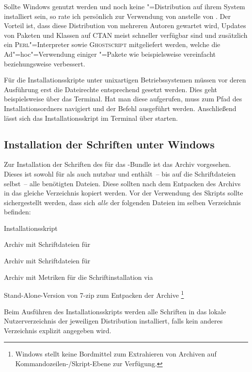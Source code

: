 Sollte Windows genutzt werden und noch keine "=Distribution auf 
ihrem System installiert sein, so rate ich persönlich zur Verwendung von 
 anstelle von . 
Der Vorteil ist, dass diese Distribution von mehreren Autoren gewartet wird, 
Updates von Paketen und Klassen auf CTAN meist schneller verfügbar sind und 
zusätzlich ein \textsc{Perl}"=Interpreter sowie \textsc{Ghostscript} 
mitgeliefert werden, welche die Ad"=hoc"=Verwendung einiger 
"=Pakete wie beispielsweise  vereinfacht 
beziehungsweise verbessert.

Für die Installationsskripte unter unixartigen Betriebssystemen müssen vor 
deren Ausführung erst die Dateirechte entsprechend gesetzt werden. Dies geht 
beispielsweise über das Terminal. Hat man diese aufgerufen, muss zum Pfad des 
Installationsordners navigiert und der Befehl 
ausgeführt werden. Anschließend lässt sich das Installationsskript im Terminal
über  starten.


\subsection{Installation der Schriften unter Windows}
\label{sec:install:fonts:win}
Zur Installation der Schriften des \CDs für das \TUDScript-Bundle ist das Archiv
%
{} vorgesehen. Dieses ist sowohl für 
 als auch  
nutzbar und enthält~-- bis auf die Schriftdateien selbst~-- alle benötigten 
Dateien. Diese sollten nach dem Entpacken des Archivs in das gleiche 
Verzeichnis kopiert werden. Vor der Verwendung des Skripts 
 sollte sichergestellt werden, dass sich 
\emph{alle} der folgenden Dateien im selben Verzeichnis befinden:
%
%
\begin{description}[labelwidth=\tempdim,labelsep=1em]
  \item[\File{tudscrfonts\_install.bat}]Installationsskript
  \item[\File{Univers\_PS.zip}]Archiv mit Schriftdateien für \Univers
  \item[\File{DIN\_Bd\_PS.zip}]Archiv mit Schriftdateien für \DIN
  \item[\File{tudscrfonts.zip}]Archiv mit Metriken für die
    Schriftinstallation via 
  \item[\File{7za.exe}]Stand-Alone-Version von 7-zip zum Entpacken der Archive%
    \footnote{%
      Windows stellt keine Bordmittel zum Extrahieren von Archiven auf 
      Kommandozeilen-/Skript-Ebene zur Verfügung.%
    }%
\end{description}
%
Beim Ausführen des Installationsskripts werden alle Schriften in das lokale 
Nutzerverzeichnis der jeweiligen Distribution installiert, falls kein anderes 
Verzeichnis explizit angegeben wird.

